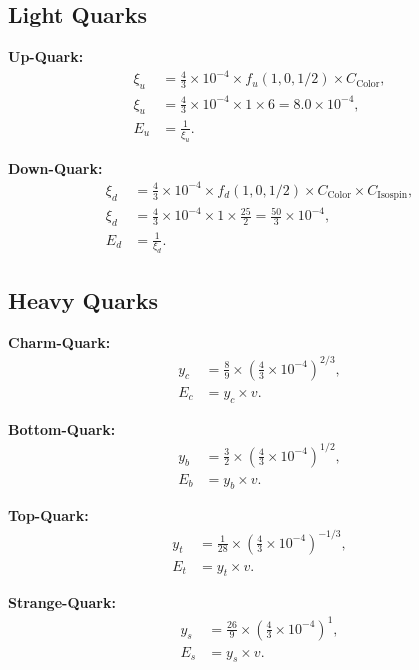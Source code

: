 \documentclass[12pt,a4paper]{article}
\begin{document}
	\subsection{Light Quarks}
	
	\textbf{Up-Quark:}
	\begin{align}
		\xi_u &= \frac{4}{3} \times 10^{-4} \times f_u(1,0,1/2) \times C_{\text{Color}}, \\
		\xi_u &= \frac{4}{3} \times 10^{-4} \times 1 \times 6 = 8.0 \times 10^{-4}, \\
		E_u &= \frac{1}{\xi_u}.
	\end{align}
	
	\textbf{Down-Quark:}
	\begin{align}
		\xi_d &= \frac{4}{3} \times 10^{-4} \times f_d(1,0,1/2) \times C_{\text{Color}} \times C_{\text{Isospin}}, \\
		\xi_d &= \frac{4}{3} \times 10^{-4} \times 1 \times \frac{25}{2} = \frac{50}{3} \times 10^{-4}, \\
		E_d &= \frac{1}{\xi_d}.
	\end{align}
	
	\subsection{Heavy Quarks}
	
	\textbf{Charm-Quark:}
	\begin{align}
		y_c &= \frac{8}{9} \times \left(\frac{4}{3} \times 10^{-4}\right)^{2/3}, \\
		E_c &= y_c \times v.
	\end{align}
	
	\textbf{Bottom-Quark:}
	\begin{align}
		y_b &= \frac{3}{2} \times \left(\frac{4}{3} \times 10^{-4}\right)^{1/2}, \\
		E_b &= y_b \times v.
	\end{align}
	
	\textbf{Top-Quark:}
	\begin{align}
		y_t &= \frac{1}{28} \times \left(\frac{4}{3} \times 10^{-4}\right)^{-1/3}, \\
		E_t &= y_t \times v.
	\end{align}
	
	\textbf{Strange-Quark:}
	\begin{align}
		y_s &= \frac{26}{9} \times \left(\frac{4}{3} \times 10^{-4}\right)^{1}, \\
		E_s &= y_s \times v.
	\end{align}
	
\end{document}
